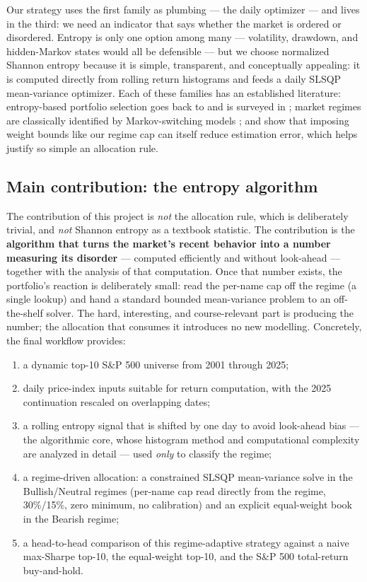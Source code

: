 \documentclass[a4paper,12pt]{article}
\begin{document}
Our strategy uses the first family as plumbing --- the daily optimizer --- and lives in the third: we need an indicator that says whether the market is ordered or disordered. Entropy is only one option among many --- volatility, drawdown, and hidden-Markov states would all be defensible --- but we choose normalized Shannon entropy because it is simple, transparent, and conceptually appealing: it is computed directly from rolling return histograms and feeds a daily SLSQP mean-variance optimizer. Each of these families has an established literature: entropy-based portfolio selection goes back to \cite{philippatos} and is surveyed in \cite{zhou}; market regimes are classically identified by Markov-switching models \cite{hamilton}; and \cite{jagannathan} show that imposing weight bounds like our regime cap can itself reduce estimation error, which helps justify so simple an allocation rule.

\subsection{Main contribution: the entropy algorithm}

The contribution of this project is \emph{not} the allocation rule, which is deliberately trivial, and \emph{not} Shannon entropy as a textbook statistic. The contribution is the \textbf{algorithm that turns the market's recent behavior into a number measuring its disorder} --- computed efficiently and without look-ahead --- together with the analysis of that computation. Once that number exists, the portfolio's reaction is deliberately small: read the per-name cap off the regime (a single lookup) and hand a standard bounded mean-variance problem to an off-the-shelf solver. The hard, interesting, and course-relevant part is producing the number; the allocation that consumes it introduces no new modelling. Concretely, the final workflow provides:
\begin{enumerate}[label=\arabic*.]
    \item a dynamic top-10 S\&P 500 universe from 2001 through 2025;
    \item daily price-index inputs suitable for return computation, with the 2025 continuation rescaled on overlapping dates;
    \item a rolling entropy signal that is shifted by one day to avoid look-ahead bias --- the algorithmic core, whose histogram method and computational complexity are analyzed in detail --- used \emph{only} to classify the regime;
    \item a regime-driven allocation: a constrained SLSQP mean-variance solve in the Bullish/Neutral regimes (per-name cap read directly from the regime, 30\%/15\%, zero minimum, no calibration) and an explicit equal-weight book in the Bearish regime;
    \item a head-to-head comparison of this regime-adaptive strategy against a naive max-Sharpe top-10, the equal-weight top-10, and the S\&P 500 total-return buy-and-hold.
\end{enumerate}
\end{document}
